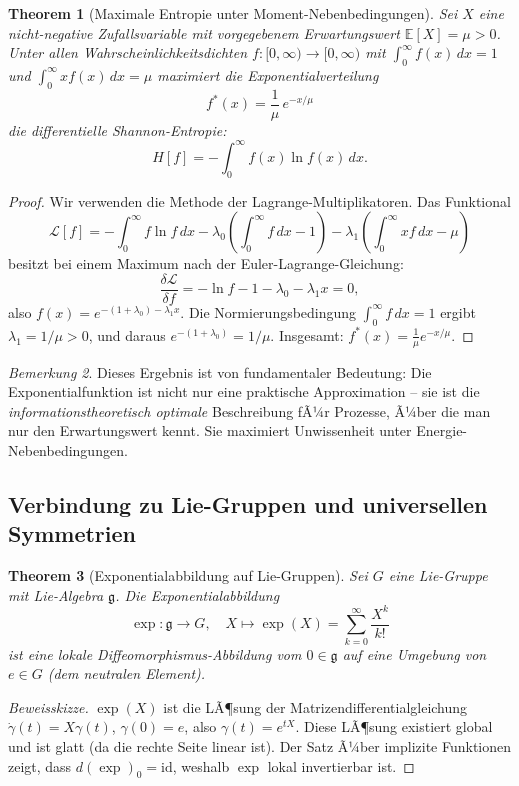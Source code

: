 ﻿\documentclass[12pt,a4paper]{article}
\newtheorem{theorem}{Theorem}[section]
\theoremstyle{definition}
\theoremstyle{remark}
\newtheorem{remark}[theorem]{Bemerkung}
\begin{document}
\begin{theorem}[Maximale Entropie unter Moment-Nebenbedingungen]
\label{thm:max_entropie}
Sei $X$ eine nicht-negative Zufallsvariable mit vorgegebenem Erwartungswert $\mathbb{E}[X] = \mu > 0$. Unter allen Wahrscheinlichkeitsdichten $f: [0,\infty) \to [0,\infty)$ mit $\int_0^\infty f(x)\,dx = 1$ und $\int_0^\infty x f(x)\,dx = \mu$ maximiert die \emph{Exponentialverteilung}
\begin{equation}
f^*(x) = \frac{1}{\mu}\,e^{-x/\mu}
\end{equation}
die differentielle Shannon-Entropie:
\begin{equation}
H[f] = -\int_0^\infty f(x)\ln f(x)\,dx.
\end{equation}
\end{theorem}
\begin{proof}
Wir verwenden die Methode der Lagrange-Multiplikatoren. Das Funktional
\[
\mathcal{L}[f] = -\int_0^\infty f\ln f\,dx - \lambda_0\left(\int_0^\infty f\,dx - 1\right) - \lambda_1\left(\int_0^\infty xf\,dx - \mu\right)
\]
besitzt bei einem Maximum nach der Euler-Lagrange-Gleichung:
\[
\frac{\delta \mathcal{L}}{\delta f} = -\ln f - 1 - \lambda_0 - \lambda_1 x = 0,
\]
also $f(x) = e^{-(1+\lambda_0)-\lambda_1 x}$. Die Normierungsbedingung $\int_0^\infty f\,dx = 1$ ergibt $\lambda_1 = 1/\mu > 0$, und daraus $e^{-(1+\lambda_0)} = 1/\mu$. Insgesamt: $f^*(x) = \frac{1}{\mu}e^{-x/\mu}$. 
\end{proof}

\begin{remark}
Dieses Ergebnis ist von fundamentaler Bedeutung: Die Exponentialfunktion ist nicht nur eine praktische Approximation -- sie ist die \emph{informationstheoretisch optimale} Beschreibung fÃ¼r Prozesse, Ã¼ber die man nur den Erwartungswert kennt. Sie maximiert Unwissenheit unter Energie-Nebenbedingungen.
\end{remark}

\subsection{Verbindung zu Lie-Gruppen und universellen Symmetrien}

\begin{theorem}[Exponentialabbildung auf Lie-Gruppen]
\label{thm:lie_exp}
Sei $G$ eine Lie-Gruppe mit Lie-Algebra $\mathfrak{g}$. Die Exponentialabbildung
\begin{equation}
\exp: \mathfrak{g} \to G, \quad X \mapsto \exp(X) = \sum_{k=0}^\infty \frac{X^k}{k!}
\end{equation}
ist eine lokale Diffeomorphismus-Abbildung vom $0 \in \mathfrak{g}$ auf eine Umgebung von $e \in G$ (dem neutralen Element).
\end{theorem}
\begin{proof}[Beweisskizze]
$\exp(X)$ ist die LÃ¶sung der Matrizendifferentialgleichung $\dot{\gamma}(t) = X\gamma(t)$, $\gamma(0) = e$, also $\gamma(t) = e^{tX}$. Diese LÃ¶sung existiert global und ist glatt (da die rechte Seite linear ist). Der Satz Ã¼ber implizite Funktionen zeigt, dass $d(\exp)_0 = \text{id}$, weshalb $\exp$ lokal invertierbar ist. 
\end{proof}
\end{document}
